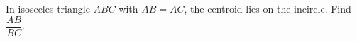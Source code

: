 In isosceles triangle $ABC$ with $AB=AC$, the centroid lies on the incircle. Find $\dfrac{AB}{BC}$.
